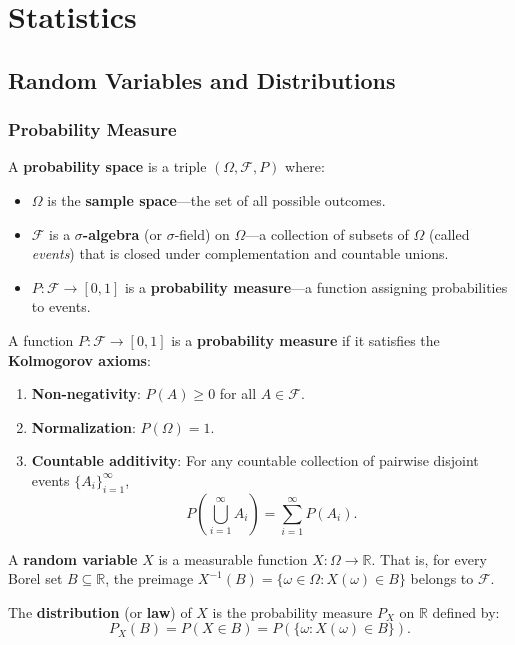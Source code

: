 \part{Statistics}

\chapter{Random Variables and Distributions}

\section{Probability Measure}

\begin{definition}
    A \textbf{probability space} is a triple $(\Omega, \mathcal{F}, P)$ where:
    \begin{itemize}
        \item $\Omega$ is the \textbf{sample space}---the set of all possible outcomes.
        \item $\mathcal{F}$ is a \textbf{$\sigma$-algebra} (or $\sigma$-field) on $\Omega$---a collection of subsets of $\Omega$ (called \emph{events}) that is closed under complementation and countable unions.
        \item $P: \mathcal{F} \to [0,1]$ is a \textbf{probability measure}---a function assigning probabilities to events.
    \end{itemize}
\end{definition}

\begin{definition}
    A function $P: \mathcal{F} \to [0,1]$ is a \textbf{probability measure} if it satisfies the \textbf{Kolmogorov axioms}:
    \begin{enumerate}
        \item \textbf{Non-negativity}: $P(A) \geq 0$ for all $A \in \mathcal{F}$.
        \item \textbf{Normalization}: $P(\Omega) = 1$.
        \item \textbf{Countable additivity}: For any countable collection of pairwise disjoint events $\{A_i\}_{i=1}^\infty$,
              \[
                  P\left( \bigcup_{i=1}^\infty A_i \right) = \sum_{i=1}^\infty P(A_i).
              \]
    \end{enumerate}
\end{definition}

\begin{definition}
    A \textbf{random variable} $X$ is a measurable function $X: \Omega \to \mathbb{R}$. That is, for every Borel set $B \subseteq \mathbb{R}$, the preimage $X^{-1}(B) = \{\omega \in \Omega : X(\omega) \in B\}$ belongs to $\mathcal{F}$.

    The \textbf{distribution} (or \textbf{law}) of $X$ is the probability measure $P_X$ on $\mathbb{R}$ defined by:
    \[
        P_X(B) = P(X \in B) = P(\{\omega : X(\omega) \in B\}).
    \]
\end{definition}

